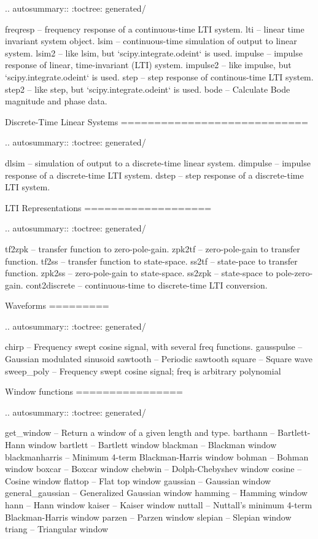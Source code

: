 \begin{DoxyVerb}
.. autosummary::
   :toctree: generated/

   freqresp -- frequency response of a continuous-time LTI system.
   lti      -- linear time invariant system object.
   lsim     -- continuous-time simulation of output to linear system.
   lsim2    -- like lsim, but `scipy.integrate.odeint` is used.
   impulse  -- impulse response of linear, time-invariant (LTI) system.
   impulse2 -- like impulse, but `scipy.integrate.odeint` is used.
   step     -- step response of continous-time LTI system.
   step2    -- like step, but `scipy.integrate.odeint` is used.
   bode     -- Calculate Bode magnitude and phase data.

Discrete-Time Linear Systems
============================

.. autosummary::
   :toctree: generated/

   dlsim    -- simulation of output to a discrete-time linear system.
   dimpulse -- impulse response of a discrete-time LTI system.
   dstep    -- step response of a discrete-time LTI system.

LTI Representations
===================

.. autosummary::
   :toctree: generated/

   tf2zpk        -- transfer function to zero-pole-gain.
   zpk2tf        -- zero-pole-gain to transfer function.
   tf2ss         -- transfer function to state-space.
   ss2tf         -- state-pace to transfer function.
   zpk2ss        -- zero-pole-gain to state-space.
   ss2zpk        -- state-space to pole-zero-gain.
   cont2discrete -- continuous-time to discrete-time LTI conversion.

Waveforms
=========

.. autosummary::
   :toctree: generated/

   chirp       -- Frequency swept cosine signal, with several freq functions.
   gausspulse  -- Gaussian modulated sinusoid
   sawtooth    -- Periodic sawtooth
   square      -- Square wave
   sweep_poly  -- Frequency swept cosine signal; freq is arbitrary polynomial

Window functions
================

.. autosummary::
   :toctree: generated/

   get_window        -- Return a window of a given length and type.
   barthann          -- Bartlett-Hann window
   bartlett          -- Bartlett window
   blackman          -- Blackman window
   blackmanharris    -- Minimum 4-term Blackman-Harris window
   bohman            -- Bohman window
   boxcar            -- Boxcar window
   chebwin           -- Dolph-Chebyshev window
   cosine            -- Cosine window
   flattop           -- Flat top window
   gaussian          -- Gaussian window
   general_gaussian  -- Generalized Gaussian window
   hamming           -- Hamming window
   hann              -- Hann window
   kaiser            -- Kaiser window
   nuttall           -- Nuttall's minimum 4-term Blackman-Harris window
   parzen            -- Parzen window
   slepian           -- Slepian window
   triang            -- Triangular window


\end{DoxyVerb}
